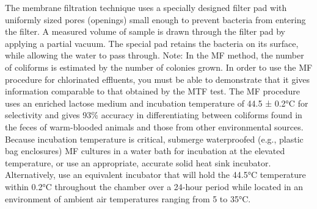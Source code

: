 \documentclass{article}
\begin{document}
The membrane filtration technique uses a specially designed filter pad
with uniformly sized pores (openings) small enough to prevent bacteria
from entering the filter. A measured volume of sample is drawn through
the filter pad by applying a partial vacuum. The special pad retains the
bacteria on its surface, while allowing the water to pass through. Note:
In the MF method, the number of coliforms is estimated by the number of
colonies grown. In order to use the MF procedure for chlorinated
effluents, you must be able to demonstrate that it gives information
comparable to that obtained by the MTF test. The MF procedure uses an
enriched lactose medium and incubation temperature of 44.5 ± 0.2°C for
selectivity and gives 93\% accuracy in differentiating between coliforms
found in the feces of warm-blooded animals and those from other
environmental sources. Because incubation temperature is critical,
submerge waterproofed (e.g., plastic bag enclosures) MF cultures in a
water bath for incubation at the elevated temperature, or use an
appropriate, accurate solid heat sink incubator. Alternatively, use an
equivalent incubator that will hold the 44.5°C temperature within 0.2°C
throughout the chamber over a 24-hour period while located in an
environment of ambient air temperatures ranging from 5 to 35°C.
\end{document}
